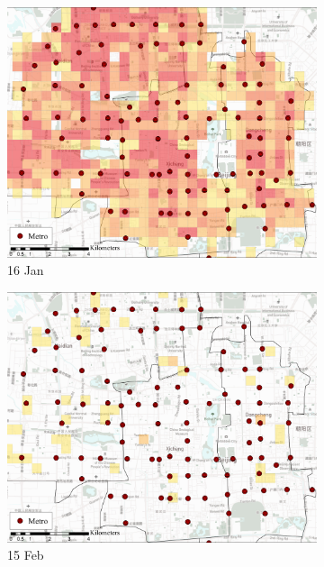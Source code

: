 \documentclass[preprints,article,accept,moreauthors,pdftex]{Definitions/mdpi}
\begin{document}
\begin{figure}[H]
    \centering
    \begin{subfigure}{.32\textwidth}
        \includegraphics[width=\textwidth]{Figures/Relation_with_POIs/POIsMetroD2020_01_16.pdf}
        \caption{16 Jan}
    \end{subfigure}
    \begin{subfigure}{.32\textwidth}
        \includegraphics[width=\textwidth]{Figures/Relation_with_POIs/POIsMetroD2020_02_15.pdf}
        \caption{15 Feb}
    \end{subfigure}
    \begin{subfigure}{.32\textwidth}

\end{subfigure}
\end{figure}
\end{document}
